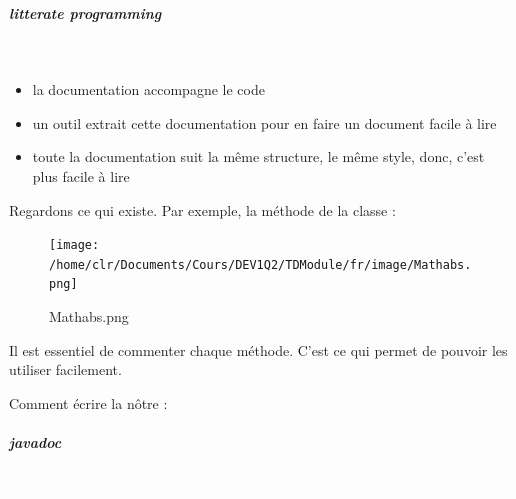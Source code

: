 \documentclass[11pt,a4paper]{article}
\begin{document}
            \par
        
			
		\subparagraph{litterate programming} 
		
					\textcolor{white}{.} \par
				
					\begin{itemize}
				
			\item la documentation accompagne le code
			\item un outil extrait cette documentation pour en faire un document facile \`a lire
			\item toute la documentation suit la m\^eme structure, le m\^eme style, donc, c'est plus facile \`a lire
					\end{itemize}
				
            \par
        
		    Regardons ce qui existe. 
		    Par exemple, la m\'ethode \verb@abs@ de la classe \verb@Math@ :
		  
            \par
        \begin{figure}[hbt]
				    \begin{center}
					\texttt{[image: /home/clr/Documents/Cours/DEV1Q2/TDModule/fr/image/Mathabs.png]}
						\end{center}
                
                    \caption[Mathabs.png]{Mathabs.png}
                \end{figure}
                    
            \par
        
		    Il est essentiel de commenter chaque m\'ethode. C'est ce qui permet de pouvoir les utiliser facilement.
		  
            \par
        
		    Comment \'ecrire la n\^otre :
		  
            \par
        
			
		\subparagraph{javadoc} 
		
					\textcolor{white}{.} \par
				
\end{document}
